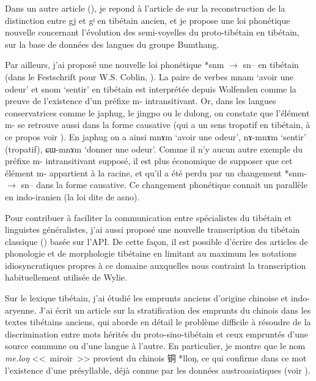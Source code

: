 \documentclass[oldfontcommands,oneside,a4paper,11pt]{memoir}
\newcommand{\ipa}[1]{{\phon #1}} %
\newcommand{\zh}[1]{{\cn #1}}
\begin{document}
Dans un autre article (\citealt{jacques13yod}), je repond à l'article de \citet{hill12gy} sur la reconstruction de la distinction entre \ipa{gj} et \ipa{gʲ} en tibétain ancien, et je propose une loi phonétique nouvelle concernant l'évolution des semi-voyelles du proto-tibétain en tibétain, sur la base de données des langues du groupe Bumthang.

Par ailleurs, j'ai proposé une nouvelle loi phonétique *snm $\rightarrow$ sn-- en tibétain (dans le Festschrift pour W.S. Coblin, \citealt{jacques14snom}). La paire de verbes \ipa{mnam} `avoir une odeur' et \ipa{snom} `sentir' en tibétain est interprétée depuis Wolfenden comme la preuve de l'existence d'un préfixe m- intransitivant. Or, dans les langues conservatrices comme le japhug, le jingpo ou le dulong, on constate que l'élément m- se retrouve aussi dans la forme causative (qui a un sens tropatif en tibétain, à ce propos voir \citealt{jacques13tropative}). En japhug on a ainsi \ipa{mnɤm} `avoir une odeur', \ipa{nɤ-mnɤm} `sentir' (tropatif), \ipa{ɕɯ-mnɤm} `donner une odeur'. Comme il n'y aucun autre exemple du préfixe m- intransitivant supposé, il est plus économique de supposer que cet élément m- appartient à la racine, et qu'il a été perdu par un changement *snm- $\rightarrow$ sn-- dans la forme causative. Ce changement phonétique connait un parallèle en indo-iranien (la loi dite de \ipa{asno}).

Pour contribuer à faciliter la communication entre spécialistes du tibétain et linguistes généralistes, j'ai aussi proposé une nouvelle transcription du tibétain classique (\citealt{jacques12transcription}) basée sur l'API. De cette façon, il est possible d'écrire des articles de phonologie et de morphologie tibétaine en limitant au maximum les notations idiosyncratiques propres à ce domaine auxquelles nous contraint la transcription habituellement utilisée de Wylie.

Sur le lexique tibétain, j’ai étudié les emprunts anciens d’origine chinoise et indo-aryenne. J’ai écrit un article sur la stratification des emprunts du chinois dans les textes tibétains anciens, qui aborde en détail le problème difficile à résoudre de la discrimination entre mots hérités du proto-sino-tibétain et ceux empruntés d’une source commune ou d’une langue à l’autre. En particulier, je montre que le nom \textit{me.loŋ} <<~miroir~>> provient du chinois \zh{铜} *lloŋ, ce qui confirme dans ce mot l'existence d'une présyllable, déjà connue par les données austroasiatiques (voir \citealt{sagart99roc}). 
\end{document}
